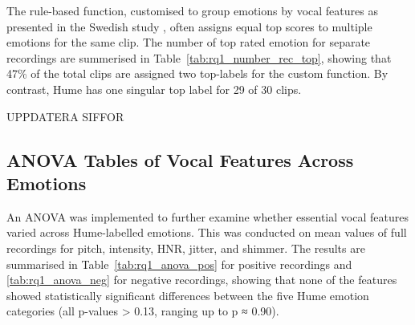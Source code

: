 The rule-based function, customised to group emotions by vocal features as presented in the Swedish study \autocite{Ekberg2023}, often assigns equal top scores to multiple emotions for the same clip. 
The number of top rated emotion for separate recordings are summerised in Table~\ref{tab:rq1_number_rec_top}, showing that 47\% of the total clips are assigned two top-labels for the custom function. By contrast, Hume has one singular top label for 29 of 30 clips. 

\medskip

UPPDATERA SIFFOR

\medskip
    

\subsection{ANOVA Tables of Vocal Features Across Emotions}
An ANOVA was implemented to further examine whether essential vocal features varied across Hume-labelled emotions. This was conducted on mean values of full recordings for pitch, intensity, HNR, jitter, and shimmer. 
The results are summarised in Table~\ref{tab:rq1_anova_pos} for positive recordings and \ref{tab:rq1_anova_neg} for negative recordings, 
showing that none of the features showed statistically significant differences between the five Hume emotion categories (all p-values > 0.13, ranging up to p ≈ 0.90). 

